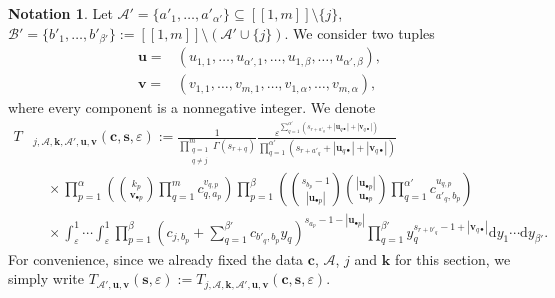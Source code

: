 \documentclass[a4paper]{amsart}
\theoremstyle{remark}
\theoremstyle{definition}
\newtheorem*{notation}{Notation}
\newcommand{\dd}{\mathrm{d}}
\begin{document}
\begin{notation}
Let $\mathcal{A}'=\{ a'_1,\ldots,a'_{\alpha'} \} \subseteq [\![ 1,m ]\!] \setminus \{ j \}$, $\mathcal{B}'=\{ b'_1,\ldots,b'_{\beta'} \} := [\![ 1,m ]\!] \setminus ( \mathcal{A}' \cup \{ j \})$. We consider two tuples 
\begin{align*}
    \mathbf{u}=&(u_{1,1},\ldots,u_{\alpha',1},\ldots,u_{1,\beta},\ldots,u_{\alpha',\beta}), \\
    \mathbf{v}=&(v_{1,1},\ldots,v_{m,1},\ldots,v_{1,\alpha},\ldots,v_{m,\alpha}),
\end{align*}
where every component is a nonnegative integer. We denote
\begin{align}
    T&_{j,\mathcal{A},\mathbf{k},\mathcal{A}',\mathbf{u},\mathbf{v}}(\mathbf{c},\mathbf{s},\varepsilon) := \frac{1}{\prod_{\substack{q=1 \\ q \neq j}}^{m} \Gamma(s_{r+q})}\frac{\varepsilon^{ \sum_{q=1}^{\alpha'} \left(s_{r+a'_q}+|\mathbf{u}_{q \bullet}| + |\mathbf{v}_{q \bullet}|\right)}}{\prod_{q=1}^{\alpha'} (s_{r+a'_q}+ |\mathbf{u}_{q \bullet}| + |\mathbf{v}_{q \bullet}|)} \nonumber \\
    & \quad \times \prod_{p=1}^{\alpha} \left(\binom{k_p}{\mathbf{v}_{\bullet p}} \prod_{q=1}^m c_{q,a_p}^{v_{q,p}} \right) \prod_{p=1}^{\beta} \left( \binom{s_{b_p}-1}{|\mathbf{u}_{\bullet p}|} \binom{|\mathbf{u}_{\bullet p}|}{\mathbf{u}_{\bullet p}} \prod_{q=1}^{\alpha'} c_{a'_q,b_p}^{u_{q,p}} \right) \label{eq:expression_T_Ajepsilon_s} \\
    & \quad \times \int_{\varepsilon}^{1} \cdots \int_{\varepsilon}^1 \prod_{p=1}^{\beta} \left( c_{j,b_p}+\sum_{q=1}^{\beta'} c_{b'_q,b_p} y_{q} \right)^{s_{a_p}-1-|\mathbf{u}_{\bullet p}|} \prod_{q=1}^{\beta'} y_q^{s_{r+b'_q}-1+ |\mathbf{v}_{q \bullet}|} \dd y_1 \cdots \dd y_{\beta'}. \nonumber
\end{align}
For convenience, since we already fixed the data $\mathbf{c}$, $\mathcal{A}$, $j$ and $\mathbf{k}$ for this section, we simply write $T_{\mathcal{A}',\mathbf{u},\mathbf{v}}(\mathbf{s},\varepsilon):=T_{j,\mathcal{A},\mathbf{k},\mathcal{A}',\mathbf{u},\mathbf{v}}(\mathbf{c},\mathbf{s},\varepsilon)$.
\end{notation}
\end{document}
